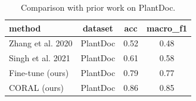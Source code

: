 \begin{table}[htbp]
\caption{Comparison with prior work on PlantDoc.}
\label{tab:sota}
\begin{tabular}{lccc}
\toprule
method & dataset & acc & macro\_f1 \\
\midrule
Zhang et al. 2020 & PlantDoc & 0.52 & 0.48 \\
Singh et al. 2021 & PlantDoc & 0.61 & 0.58 \\
Fine-tune (ours) & PlantDoc & 0.79 & 0.77 \\
CORAL (ours) & PlantDoc & 0.86 & 0.85 \\
\bottomrule
\end{tabular}
\end{table}
